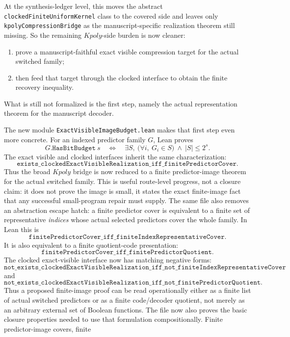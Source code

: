 \documentclass[11pt]{article}
\theoremstyle{remark}
\begin{document}
At the synthesis-ledger level, this moves the abstract
\texttt{clockedFiniteUniformKernel} class to the covered side and leaves only
\texttt{kpolyCompressionBridge} as the manuscript-specific realization theorem
still missing.
So the remaining \(Kpoly\)-side burden is now cleaner:
\begin{enumerate}[leftmargin=1.5em]
  \item prove a manuscript-faithful exact visible compression target for the actual switched family;
  \item then feed that target through the clocked interface to obtain the finite recovery inequality.
\end{enumerate}
What is still not formalized is the first step, namely the actual
representation theorem for the manuscript decoder.

The new module \texttt{ExactVisibleImageBudget.lean} makes that first step even
more concrete.  For an indexed predictor family \(G\), Lean proves
\[
  G.\texttt{HasBitBudget}\ s
  \quad\Longleftrightarrow\quad
  \exists S,\ \bigl(\forall i,\ G_i\in S\bigr)\ \wedge\ |S|\le 2^s.
\]
The exact visible and clocked interfaces inherit the same characterization:
\[
  \texttt{exists\_clockedExactVisibleRealization\_iff\_finitePredictorCover}.
\]
Thus the broad \(Kpoly\) bridge is now reduced to a finite predictor-image
theorem for the actual switched family.  This is useful route-level progress,
not a closure claim: it does not prove the image is small, it states the exact
finite-image fact that any successful small-program repair must supply.
The same file also removes an abstraction escape hatch: a finite predictor
cover is equivalent to a finite set of representative \emph{indices} whose
actual selected predictors cover the whole family.  In Lean this is
\[
  \texttt{finitePredictorCover\_iff\_finiteIndexRepresentativeCover}.
\]
It is also equivalent to a finite quotient-code presentation:
\[
  \texttt{finitePredictorCover\_iff\_finitePredictorQuotient}.
\]
The clocked exact-visible interface now has matching negative forms:
\[
  \texttt{not\_exists\_clockedExactVisibleRealization\_iff\_not\_finiteIndexRepresentativeCover}
\]
and
\[
  \texttt{not\_exists\_clockedExactVisibleRealization\_iff\_not\_finitePredictorQuotient}.
\]
Thus a proposed finite-image proof can be read operationally either as a finite
list of actual switched predictors or as a finite code/decoder quotient, not
merely as an arbitrary external set of Boolean functions.
The file now also proves the basic closure properties needed to use that
formulation compositionally.  Finite predictor-image covers, finite
\end{document}
